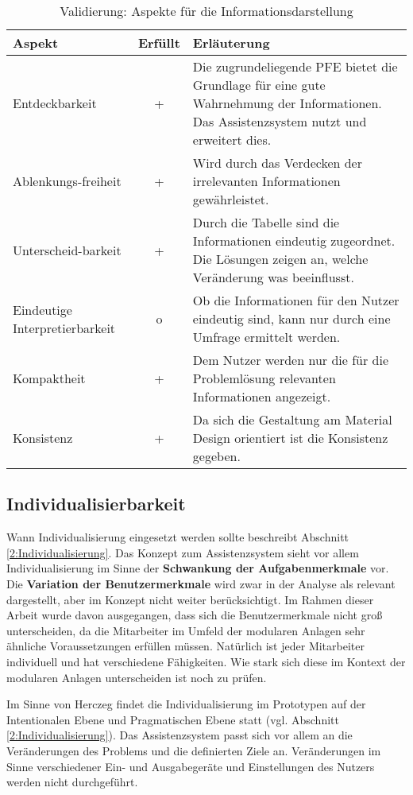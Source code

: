 \begin{table}
\caption{Validierung: Aspekte für die Informationsdarstellung}
\centering
\begin{tabular}{p{}|c|p{}}
\textbf{Aspekt} & \textbf{Erfüllt} & \textbf{Erläuterung} \\
\hline
Entdeckbarkeit & + & Die zugrundeliegende PFE bietet die Grundlage für eine gute Wahrnehmung der Informationen. Das Assistenzsystem nutzt und erweitert dies. \\
\hline
Ablenkungs-freiheit & + & Wird durch das Verdecken der irrelevanten Informationen gewährleistet. \\
\hline
Unterscheid-barkeit & + & Durch die Tabelle sind die Informationen eindeutig zugeordnet. Die Lösungen zeigen an, welche Veränderung was beeinflusst. \\
\hline
Eindeutige Interpretierbarkeit & o & Ob die Informationen für den Nutzer eindeutig sind, kann nur durch eine Umfrage ermittelt werden.\\
\hline
Kompaktheit & + & Dem Nutzer werden nur die für die Problemlösung relevanten Informationen angezeigt. \\
\hline
Konsistenz & + & Da sich die Gestaltung am Material Design orientiert ist die Konsistenz gegeben. \\
\end{tabular}
\label{tab:Validierung-Informationsdarstellung}
\end{table}


\subsection*{Individualisierbarkeit}
Wann Individualisierung eingesetzt werden sollte beschreibt Abschnitt \ref{2:Individualisierung}. Das Konzept zum Assistenzsystem sieht vor allem Individualisierung im Sinne der \textbf{Schwankung der Aufgabenmerkmale} vor. Die \textbf{Variation der Benutzermerkmale} wird zwar in der Analyse als relevant dargestellt, aber im Konzept nicht weiter berücksichtigt. Im Rahmen dieser Arbeit wurde davon ausgegangen, dass sich die Benutzermerkmale nicht groß unterscheiden, da die Mitarbeiter im Umfeld der modularen Anlagen sehr ähnliche Voraussetzungen erfüllen müssen. Natürlich ist jeder Mitarbeiter individuell und hat verschiedene Fähigkeiten. Wie stark sich diese im Kontext der modularen Anlagen unterscheiden ist noch zu prüfen.

Im Sinne von Herczeg findet die Individualisierung im Prototypen auf der Intentionalen Ebene und Pragmatischen Ebene statt (vgl. Abschnitt \ref{2:Individualisierung}). Das Assistenzsystem passt sich vor allem an die Veränderungen des Problems und die definierten Ziele an. Veränderungen im Sinne verschiedener Ein- und Ausgabegeräte und Einstellungen des Nutzers werden nicht durchgeführt.

